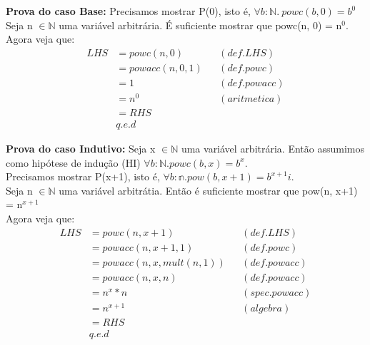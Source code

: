 \documentclass{article}
\begin{document}
\noindent\textbf{Prova do caso Base:} Precisamos mostrar P(0), isto é,
$\forall b:\mathbb{N}.\: powc(b, 0) = b^0$\\
Seja n $\in \mathbb{N}$ uma variável arbitrária. É suficiente mostrar que powc(n, 0) = n$^0$.\\
Agora veja que:
\begin{align*}
LHS &= powc(n, 0) && (def. LHS)\\
&= powacc(n, 0, 1) && (def. powc)\\
&= 1 && (def. powacc)\\
&= n^0 && (aritmetica)\\
&= RHS\\
& q.e.d
\end{align*}

\noindent\textbf{Prova do caso Indutivo:}
Seja x $\in \mathbb{N}$ uma variável arbitrária. Então assumimos como hipótese de indução (HI)
$\forall b:\mathbb{N}. powc(b, x) = b^x$.\\
Precisamos mostrar P(x+1), isto é, $\forall b:\mathbb{n}. pow(b, x+1) = b^{x+1}i$.\\
Seja n $\in \mathbb{N}$ uma variável arbitrátia. Então é suficiente mostrar que pow(n, x+1) = n$^{x+1}$\\
Agora veja que:
\begin{align*}
LHS &= powc(n, x+1) && (def. LHS)\\
&= powacc(n, x+1, 1) && (def. powc)\\
&= powacc(n, x, mult(n, 1)) && (def. powacc)\\
&= powacc(n, x, n) && (def. powacc)\\
&= n^x * n && (spec. powacc)\\
&= n^{x+1} && (algebra)\\
&= RHS\\
& q.e.d
\end{align*}
\end{document}
